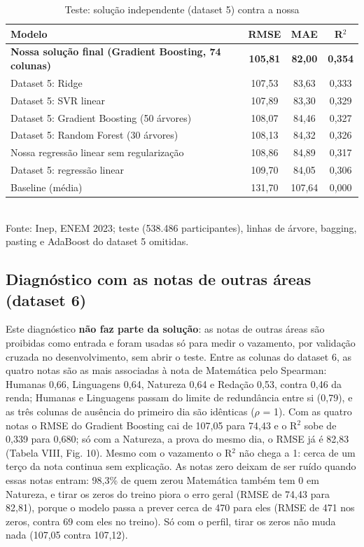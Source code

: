 \documentclass[conference,a4paper]{IEEEtran}
\begin{document}
\begin{table}[!t]
\caption{Teste: solução independente (dataset 5) contra a nossa}
\centering\footnotesize
\begin{tabularx}{\textwidth}{>{\raggedright\arraybackslash}Xccc}
\toprule
\textbf{Modelo} & \textbf{RMSE} & \textbf{MAE} & \textbf{R$^2$} \\
\midrule
\textbf{Nossa solução final (Gradient Boosting, 74 colunas)} & \textbf{105,81} & \textbf{82,00} & \textbf{0,354} \\
Dataset 5: Ridge & 107,53 & 83,63 & 0,333 \\
Dataset 5: SVR linear & 107,89 & 83,30 & 0,329 \\
Dataset 5: Gradient Boosting (50 árvores) & 108,07 & 84,46 & 0,327 \\
Dataset 5: Random Forest (30 árvores) & 108,13 & 84,32 & 0,326 \\
Nossa regressão linear sem regularização & 108,86 & 84,89 & 0,317 \\
Dataset 5: regressão linear & 109,70 & 84,05 & 0,306 \\
Baseline (média) & 131,70 & 107,64 & 0,000 \\
\bottomrule
\end{tabularx}
\\[2pt]{\scriptsize Fonte: Inep, ENEM 2023; teste (538.486 participantes), linhas de árvore, bagging, pasting e AdaBoost do dataset 5 omitidas.}
\end{table}


\subsection{Diagnóstico com as notas de outras áreas (dataset 6)}
Este diagnóstico \textbf{não faz parte da solução}: as notas de outras áreas são proibidas como entrada e foram usadas só para medir o vazamento, por validação cruzada no desenvolvimento, sem abrir o teste. Entre as colunas do dataset 6, as quatro notas são as mais associadas à nota de Matemática pelo Spearman: Humanas 0,66, Linguagens 0,64, Natureza 0,64 e Redação 0,53, contra 0,46 da renda; Humanas e Linguagens passam do limite de redundância entre si (0,79), e as três colunas de ausência do primeiro dia são idênticas ($\rho$ = 1). Com as quatro notas o RMSE do Gradient Boosting cai de 107,05 para 74,43 e o R$^2$ sobe de 0,339 para 0,680; só com a Natureza, a prova do mesmo dia, o RMSE já é 82,83 (Tabela VIII, Fig. 10). Mesmo com o vazamento o R$^2$ não chega a 1: cerca de um terço da nota continua sem explicação. As notas zero deixam de ser ruído quando essas notas entram: 98,3\% de quem zerou Matemática também tem 0 em Natureza, e tirar os zeros do treino piora o erro geral (RMSE de 74,43 para 82,81), porque o modelo passa a prever cerca de 470 para eles (RMSE de 471 nos zeros, contra 69 com eles no treino). Só com o perfil, tirar os zeros não muda nada (107,05 contra 107,12).
\end{document}
